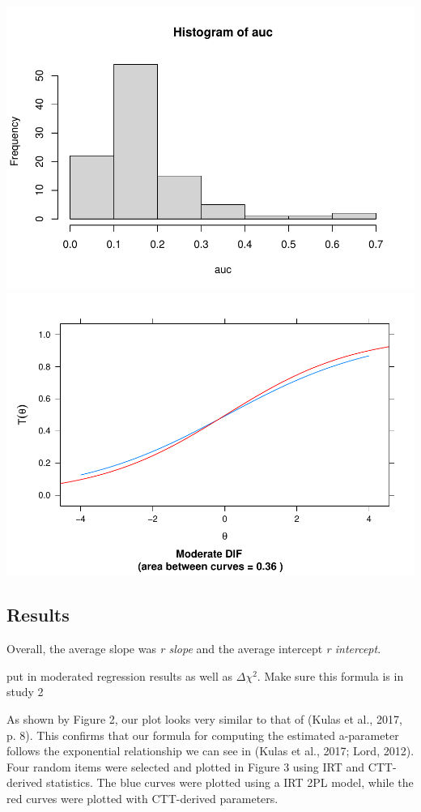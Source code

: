 \documentclass[
  man]{apa6}
\begin{document}
\includegraphics{ICC_project_files/figure-latex/sendtoETS-1.pdf} \includegraphics{ICC_project_files/figure-latex/sendtoETS-2.pdf}

\hypertarget{results}{%
\subsection{Results}\label{results}}

Overall, the average slope was \emph{r slope} and the average intercept \emph{r intercept}.

put in moderated regression results as well as \(\Delta\)\(\chi^2\). Make sure this formula is in study 2

As shown by Figure 2, our plot looks very similar to that of (Kulas et al., 2017, p. 8). This confirms that our formula for computing the estimated a-parameter follows the exponential relationship we can see in (Kulas et al., 2017; Lord, 2012). Four random items were selected and plotted in Figure 3 using IRT and CTT-derived statistics. The blue curves were plotted using a IRT 2PL model, while the red curves were plotted with CTT-derived parameters.
\end{document}
